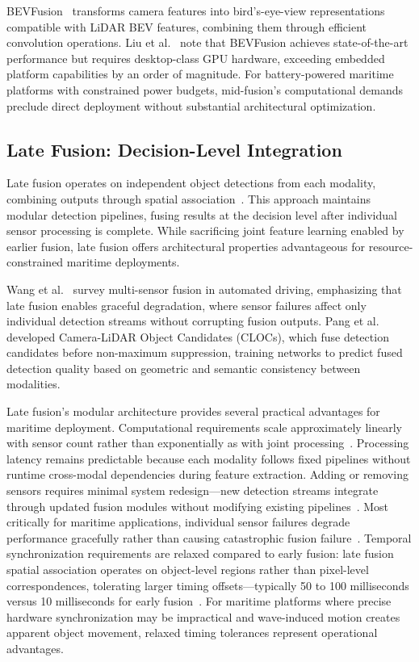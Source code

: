 \documentclass{erauthesis}
\begin{document}
BEVFusion~\cite{liang2022, liu2023b} transforms camera features into bird's-eye-view representations compatible with \ac{LiDAR} BEV features, combining them through efficient convolution operations.
Liu et al.~\cite{liu2023b} note that BEVFusion achieves state-of-the-art performance but requires desktop-class GPU hardware, exceeding embedded platform capabilities by an order of magnitude.
For battery-powered maritime platforms with constrained power budgets, mid-fusion's computational demands preclude direct deployment without substantial architectural optimization.

\subsection{Late Fusion: Decision-Level Integration}

Late fusion operates on independent object detections from each modality, combining outputs through spatial association~\cite{wang2020a, pang2020}.
This approach maintains modular detection pipelines, fusing results at the decision level after individual sensor processing is complete.
While sacrificing joint feature learning enabled by earlier fusion, late fusion offers architectural properties advantageous for resource-constrained maritime deployments.

Wang et al.~\cite{wang2020a} survey multi-sensor fusion in automated driving, emphasizing that late fusion enables graceful degradation, where sensor failures affect only individual detection streams without corrupting fusion outputs.
Pang et al.~\cite{pang2020} developed Camera-LiDAR Object Candidates (CLOCs), which fuse detection candidates before non-maximum suppression, training networks to predict fused detection quality based on geometric and semantic consistency between modalities.

Late fusion's modular architecture provides several practical advantages for maritime deployment.
Computational requirements scale approximately linearly with sensor count rather than exponentially as with joint processing~\cite{wang2020a}.
Processing latency remains predictable because each modality follows fixed pipelines without runtime cross-modal dependencies during feature extraction.
Adding or removing sensors requires minimal system redesign—new detection streams integrate through updated fusion modules without modifying existing pipelines~\cite{feng2021}.
Most critically for maritime applications, individual sensor failures degrade performance gracefully rather than causing catastrophic fusion failure~\cite{huang2024}.
Temporal synchronization requirements are relaxed compared to early fusion: late fusion spatial association operates on object-level regions rather than pixel-level correspondences, tolerating larger timing offsets—typically 50 to 100 milliseconds versus 10 milliseconds for early fusion~\cite{fung2017}.
For maritime platforms where precise hardware synchronization may be impractical and wave-induced motion creates apparent object movement, relaxed timing tolerances represent operational advantages.
\end{document}
